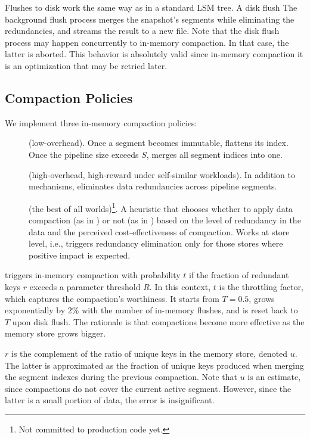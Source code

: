 Flushes to disk work the same way as in a standard LSM tree. A disk flush  The background flush process merges the snapshot's 
segments while eliminating the redundancies, and streams the result to a new file. Note that the disk flush process
may happen concurrently to in-memory compaction. In that case, the latter is aborted. This behavior is absolutely
valid since in-memory compaction it is an optimization that may be retried later.

\subsection{Compaction Policies} \label{ssec:policies}

We implement three in-memory compaction policies: 
\begin{description}
\item[\basic] (low-overhead). Once a segment becomes immutable, flattens its index. Once the pipeline size exceeds $S$, 
merges all segment indices into one.  
\item[\eager] (high-overhead, high-reward under self-similar workloads). 
In addition to \basic\/ mechanisms, eliminates data redundancies across pipeline segments.
\item[\adp] (the best of all worlds)\footnote{\small{Not committed to production code yet.}}. A heuristic that chooses 
whether to apply data compaction (as in \eager) or not (as in \basic) based on the level of redundancy in the data 
and the perceived cost-effectiveness of compaction. Works at store level, i.e., triggers redundancy elimination 
only for those stores where positive impact is expected. 
\end{description}

\adp\/ triggers in-memory compaction with probability $t$ if the fraction of redundant keys $r$ exceeds a parameter 
threshold $R$. In this context, $t$ is the throttling factor, which captures the compaction's worthiness. It starts from 
$T=0.5$, grows exponentially by $2\%$ with the number of in-memory flushes, and is reset back to $T$ upon
disk flush. The rationale is that compactions become more effective as the memory store grows bigger. 

$r$ is the complement of the ratio of unique keys in the memory store, denoted  $u$. The latter is approximated 
as the fraction of unique keys produced when merging the segment indexes during the previous compaction. 
Note that $u$ is an estimate, since compactions do not cover the current active segment. However, since the latter 
is a small portion of data, the error is insignificant. 

